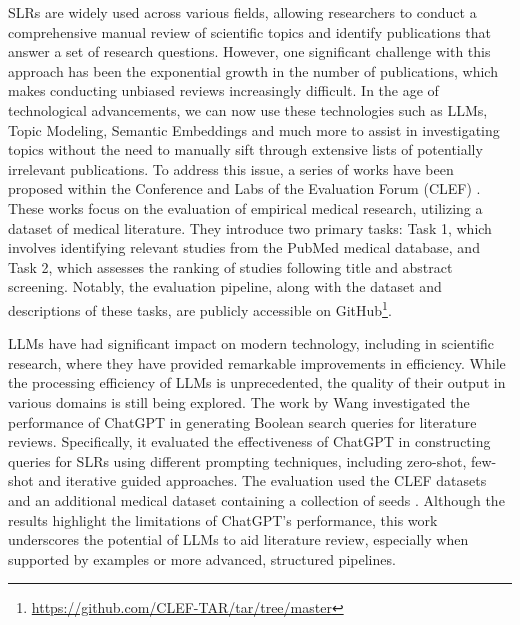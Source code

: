 SLRs are widely used across various fields, allowing researchers to conduct a comprehensive manual review of scientific topics and identify publications that answer a set of research questions. However, one significant challenge with this approach has been the exponential growth in the number of publications, which makes conducting unbiased reviews increasingly difficult. In the age of technological advancements, we can now use these technologies such as LLMs, Topic Modeling, Semantic Embeddings and much more to assist in investigating topics without the need to manually sift through extensive lists of potentially irrelevant publications. To address this issue, a series of works have been proposed within the Conference and Labs of the Evaluation Forum (CLEF) \autocite{kanoulas2017clef, kanoulas2018clef, kanoulas2019clef}. These works focus on the evaluation of empirical medical research, utilizing a dataset of medical literature. They introduce two primary tasks: Task 1, which involves identifying relevant studies from the PubMed medical database, and Task 2, which assesses the ranking of studies following title and abstract screening. Notably, the evaluation pipeline, along with the dataset and descriptions of these tasks, are publicly accessible on GitHub\footnote{\url{https://github.com/CLEF-TAR/tar/tree/master}}.

LLMs have had significant impact on modern technology, including in scientific research, where they have provided remarkable improvements in efficiency. While the processing efficiency of LLMs is unprecedented, the quality of their output in various domains is still being explored. The work by Wang \autocite{wang2023can} investigated the performance of ChatGPT in generating Boolean search queries for literature reviews. Specifically, it evaluated the effectiveness of ChatGPT in constructing queries for SLRs using different prompting techniques, including zero-shot, few-shot and iterative guided approaches. The evaluation used the CLEF datasets \autocite{kanoulas2017clef, kanoulas2018clef, kanoulas2019clef} and an additional medical dataset containing a collection of seeds \autocite{Wang_2022}. Although the results highlight the limitations of ChatGPT's performance, this work underscores the potential of LLMs to aid literature review, especially when supported by examples or more advanced, structured pipelines.

